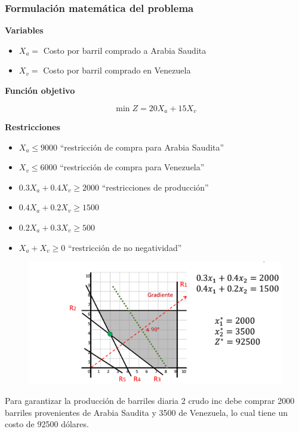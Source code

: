 \documentclass[conference]{IEEEtran}
\begin{document}
\subsubsection{Formulación matemática del problema}

\hfil{}

\textbf{Variables}

\begin{itemize}
    \item $X_{a} = $ Costo por barril comprado a Arabia Saudita
    \item $X_{v} = $ Costo por barril comprado en Venezuela
\end{itemize}

\textbf{Función objetivo}

\begin{equation*}
    \min Z = 20X_{a} + 15X_{v}
\end{equation*}

\textbf{Restricciones}

\begin{itemize}
    \item $X_{a} \leq 9000$ ``restricción de compra para Arabia Saudita''
    \item $X_{v} \leq 6000$ ``restricción de compra para Venezuela''
    \item $0.3X_{a} + 0.4X_{v} \geq 2000$ ``restricciones de producción''
    \item $0.4X_{a} + 0.2X_{v} \geq 1500$
    \item $0.2X_{a} + 0.3X_{v} \geq 500$
    \item $X_{a} + X_{v} \geq 0$ ``restricción de no negatividad''
\end{itemize}

\begin{figure}[H]
    \begin{center}
        \includegraphics[width=\linewidth]{./Images/Caso-1_ImagenSolucion.png}
        \caption{}
    \end{center}
\end{figure}

Para garantizar la producción de barriles diaria 2 crudo inc debe comprar
2000 barriles provenientes de Arabia Saudita y 3500 de Venezuela, lo cual
tiene un costo de 92500 dólares.


\end{document}
